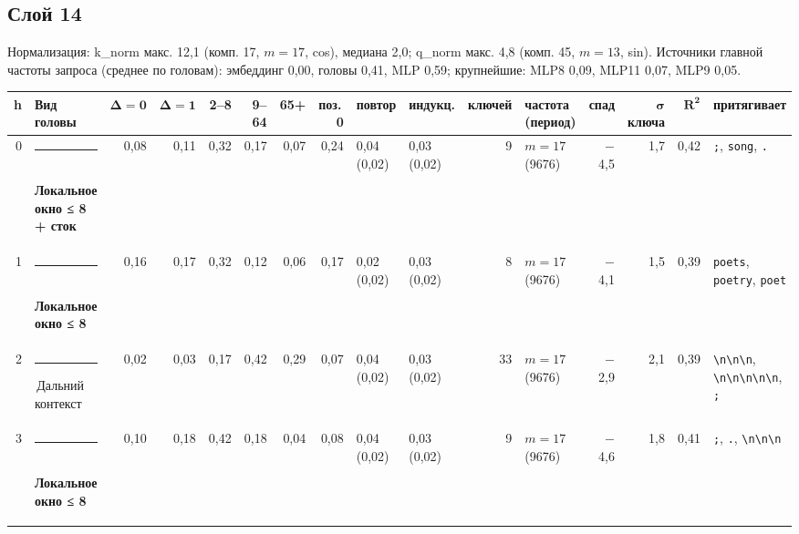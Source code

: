\documentclass[10pt]{article}
\begin{document}
\noindent\begin{minipage}{\linewidth}
\subsection*{Слой 14}
{\small\color{ink2} Нормализация: k\_norm макс. 12,1 (комп. 17, $m{=}17$, cos), медиана 2,0; q\_norm макс. 4,8 (комп. 45, $m{=}13$, sin). Источники главной частоты запроса (среднее по головам): эмбеддинг 0,00, головы 0,41, MLP 0,59; крупнейшие: MLP8 0,09, MLP11 0,07, MLP9 0,05.}
\begin{center}{\footnotesize\begin{tabular}{|r|l|r|r|r|r|r|r|l|l|r|l|r|r|r|l|}
\hline
\rowcolor{head}\textbf{h} & \textbf{Вид головы} & $\boldsymbol{\Delta{=}0}$ & $\boldsymbol{\Delta{=}1}$ & \textbf{2–8} & \textbf{9–64} & \textbf{65+} & \textbf{поз.\,0} & \textbf{повтор} & \textbf{индукц.} & \textbf{ключей} & \textbf{частота (период)} & \textbf{спад} & $\boldsymbol{\sigma}$ \textbf{ключа} & $\boldsymbol{R^2}$ & \textbf{притягивает} \\ \hline
0 & \textcolor[HTML]{1BAF7A}{\rule{0.62em}{0.62em}}\,\textbf{Локальное окно ≤ 8 + сток} & 0,08 & 0,11 & 0,32 & 0,17 & 0,07 & 0,24 & 0,04 (0,02) & 0,03 (0,02) & 9 & $m{=}17$ (9676) & $-$4,5 & 1,7 & 0,42 & \texttt{\textvisiblespace{};}, \texttt{\textvisiblespace{}song}, \texttt{\textvisiblespace{}.} \\ \hline
1 & \textcolor[HTML]{1BAF7A}{\rule{0.62em}{0.62em}}\,\textbf{Локальное окно ≤ 8} & 0,16 & 0,17 & 0,32 & 0,12 & 0,06 & 0,17 & 0,02 (0,02) & 0,03 (0,02) & 8 & $m{=}17$ (9676) & $-$4,1 & 1,5 & 0,39 & \texttt{\textvisiblespace{}poets}, \texttt{\textvisiblespace{}poetry}, \texttt{\textvisiblespace{}poet} \\ \hline
2 & \textcolor[HTML]{C3C2B7}{\rule{0.62em}{0.62em}}\,Дальний контекст & 0,02 & 0,03 & 0,17 & 0,42 & 0,29 & 0,07 & 0,04 (0,02) & 0,03 (0,02) & 33 & $m{=}17$ (9676) & $-$2,9 & 2,1 & 0,39 & \texttt{\textvisiblespace{}\textbackslash{}n\textbackslash{}n\textbackslash{}n}, \texttt{\textbackslash{}n\textbackslash{}n\textbackslash{}n\textbackslash{}n\textbackslash{}n}, \texttt{\textvisiblespace{};} \\ \hline
3 & \textcolor[HTML]{1BAF7A}{\rule{0.62em}{0.62em}}\,\textbf{Локальное окно ≤ 8} & 0,10 & 0,18 & 0,42 & 0,18 & 0,04 & 0,08 & 0,04 (0,02) & 0,03 (0,02) & 9 & $m{=}17$ (9676) & $-$4,6 & 1,8 & 0,41 & \texttt{\textvisiblespace{};}, \texttt{\textvisiblespace{}.}, \texttt{\textvisiblespace{}\textbackslash{}n\textbackslash{}n\textbackslash{}n} \\ \hline

\end{tabular}}
\end{center}
\end{minipage}
\end{document}
